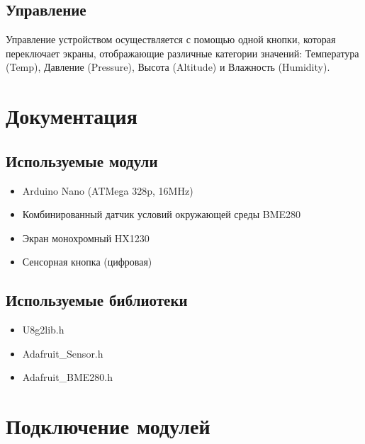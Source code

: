 \documentclass[12pt]{article}
\begin{document}
    \subsection{Управление}
      Управление устройством осуществляется с помощью одной кнопки, которая
      переключает экраны, отображающие различные категории значений:
      Температура (Temp), Давление (Pressure), Высота (Altitude) и Влажность
      (Humidity).


  \section{Документация}

    \subsection{Используемые модули}
      \begin{itemize}
        \item Arduino Nano (ATMega 328p, 16MHz)
        \item Комбинированный датчик условий окружающей среды BME280
        \item Экран монохромный HX1230
        \item Сенсорная кнопка (цифровая)
      \end{itemize}

    \subsection{Используемые библиотеки}
      \begin{itemize}
        \item U8g2lib.h
        \item Adafruit\_Sensor.h
        \item Adafruit\_BME280.h
      \end{itemize}


  \section{Подключение модулей}
\end{document}
